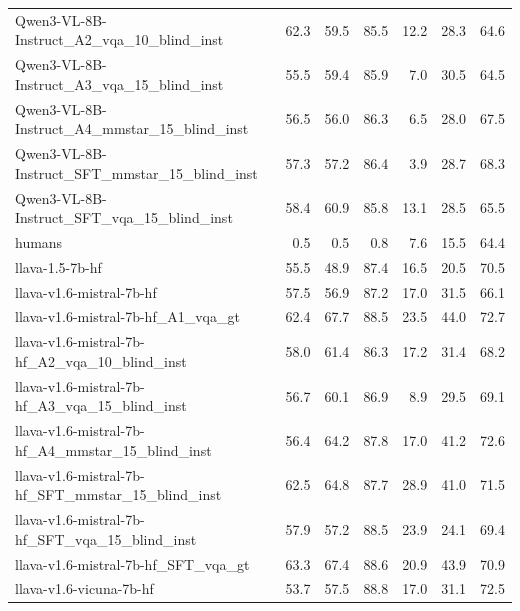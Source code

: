 \begin{tabular}{lrrrrrr}
Qwen3-VL-8B-Instruct_A2_vqa_10_blind_inst & 62.3 & 59.5 & 85.5 & 12.2 & 28.3 & 64.6 \\
Qwen3-VL-8B-Instruct_A3_vqa_15_blind_inst & 55.5 & 59.4 & 85.9 & 7.0 & 30.5 & 64.5 \\
Qwen3-VL-8B-Instruct_A4_mmstar_15_blind_inst & 56.5 & 56.0 & 86.3 & 6.5 & 28.0 & 67.5 \\
Qwen3-VL-8B-Instruct_SFT_mmstar_15_blind_inst & 57.3 & 57.2 & 86.4 & 3.9 & 28.7 & 68.3 \\
Qwen3-VL-8B-Instruct_SFT_vqa_15_blind_inst & 58.4 & 60.9 & 85.8 & 13.1 & 28.5 & 65.5 \\
humans & 0.5 & 0.5 & 0.8 & 7.6 & 15.5 & 64.4 \\
llava-1.5-7b-hf & 55.5 & 48.9 & 87.4 & 16.5 & 20.5 & 70.5 \\
llava-v1.6-mistral-7b-hf & 57.5 & 56.9 & 87.2 & 17.0 & 31.5 & 66.1 \\
llava-v1.6-mistral-7b-hf_A1_vqa_gt & 62.4 & 67.7 & 88.5 & 23.5 & 44.0 & 72.7 \\
llava-v1.6-mistral-7b-hf_A2_vqa_10_blind_inst & 58.0 & 61.4 & 86.3 & 17.2 & 31.4 & 68.2 \\
llava-v1.6-mistral-7b-hf_A3_vqa_15_blind_inst & 56.7 & 60.1 & 86.9 & 8.9 & 29.5 & 69.1 \\
llava-v1.6-mistral-7b-hf_A4_mmstar_15_blind_inst & 56.4 & 64.2 & 87.8 & 17.0 & 41.2 & 72.6 \\
llava-v1.6-mistral-7b-hf_SFT_mmstar_15_blind_inst & 62.5 & 64.8 & 87.7 & 28.9 & 41.0 & 71.5 \\
llava-v1.6-mistral-7b-hf_SFT_vqa_15_blind_inst & 57.9 & 57.2 & 88.5 & 23.9 & 24.1 & 69.4 \\
llava-v1.6-mistral-7b-hf_SFT_vqa_gt & 63.3 & 67.4 & 88.6 & 20.9 & 43.9 & 70.9 \\
llava-v1.6-vicuna-7b-hf & 53.7 & 57.5 & 88.8 & 17.0 & 31.1 & 72.5 \\
\bottomrule
\end{tabular}
